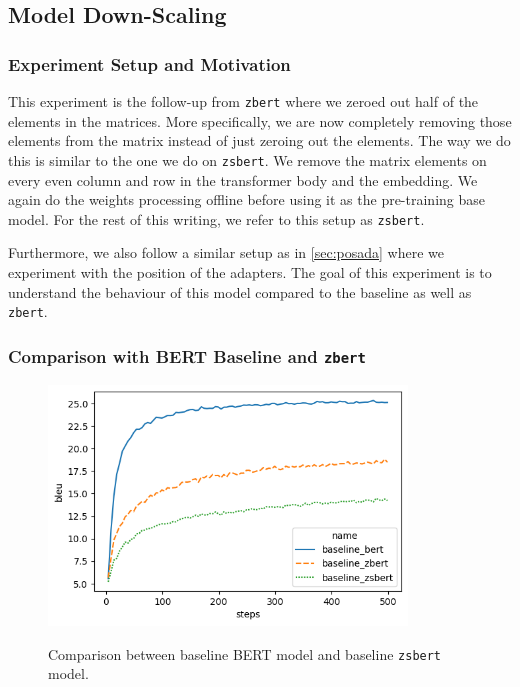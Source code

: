 \subsection{Model Down-Scaling}
\subsubsection{Experiment Setup and Motivation}
This experiment is the follow-up from \texttt{zbert} where we zeroed out half of the elements in the matrices. More specifically, we are now completely removing those elements from the matrix instead of just zeroing out the elements. The way we do this is similar to the one we do on \texttt{zsbert}. We remove the matrix elements on every even column and row in the transformer body and the embedding. We again do the weights processing offline before using it as the pre-training base model. For the rest of this writing, we refer to this setup as \texttt{zsbert}.

Furthermore, we also follow a similar setup as in \cref{sec:posada} where we experiment with the position of the adapters. The goal of this experiment is to understand the behaviour of this model compared to the baseline as well as \texttt{zbert}.

\subsubsection{Comparison with BERT Baseline and \texttt{zbert}}
\label{sec:compbasezbertzsbert}

\begin{figure}[t]
    {\includegraphics[width=0.85\textwidth]{img/baseline_zsbert.png}}
    \centering
    \caption{Comparison between baseline BERT model and baseline \texttt{zsbert} model.}
    \label{img:baseline_zsbert}
\end{figure}

